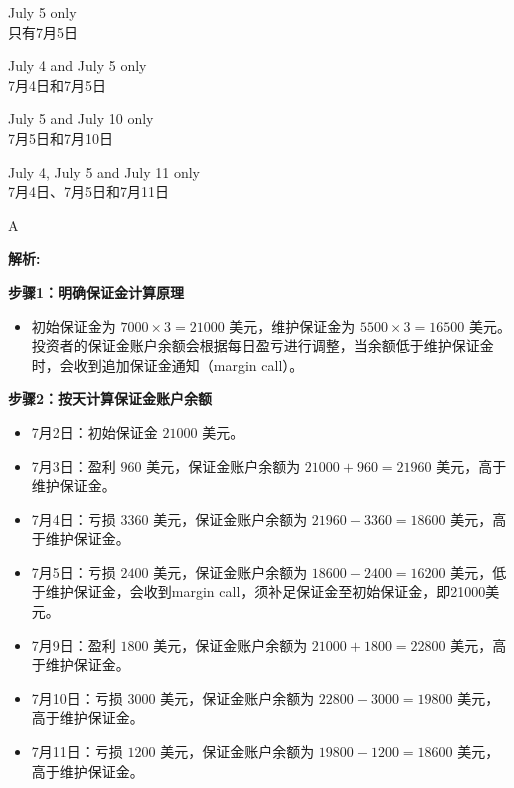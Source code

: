 \documentclass{article}
\newenvironment{explanation}
{\textbf{解析:}\par}
{\par}
\begin{document}
        \begin{choices}
            \item July 5 only\\只有7月5日
            \item July 4 and July 5 only\\7月4日和7月5日
            \item July 5 and July 10 only\\7月5日和7月10日
            \item July 4, July 5 and July 11 only\\7月4日、7月5日和7月11日
        \end{choices}
        
        \begin{correctanswer}
            A
        \end{correctanswer}
        
        \begin{explanation}
        \textbf{步骤1：明确保证金计算原理}
        \begin{itemize}
        \item 初始保证金为 \(7000\times3 = 21000\) 美元，维护保证金为 \(5500\times3 = 16500\) 美元。投资者的保证金账户余额会根据每日盈亏进行调整，当余额低于维护保证金时，会收到追加保证金通知（margin call）。
        \end{itemize}
        \textbf{步骤2：按天计算保证金账户余额}
        \begin{itemize}
        \item 7月2日：初始保证金 \(21000\) 美元。
        \item 7月3日：盈利 \(960\) 美元，保证金账户余额为 \(21000 + 960 = 21960\) 美元，高于维护保证金。
        \item 7月4日：亏损 \(3360\) 美元，保证金账户余额为 \(21960 - 3360 = 18600\) 美元，高于维护保证金。
        \item 7月5日：亏损 \(2400\) 美元，保证金账户余额为 \(18600 - 2400 = 16200\) 美元，低于维护保证金，会收到margin call，须补足保证金至初始保证金，即21000美元。
        \item 7月9日：盈利 \(1800\) 美元，保证金账户余额为 \(21000 + 1800 = 22800\) 美元，高于维护保证金。
        \item 7月10日：亏损 \(3000\) 美元，保证金账户余额为 \(22800 - 3000 = 19800\) 美元，高于维护保证金。
        \item 7月11日：亏损 \(1200\) 美元，保证金账户余额为 \(19800 - 1200 = 18600\) 美元，高于维护保证金。
        \end{itemize}
        \end{explanation}
        
\end{document}
